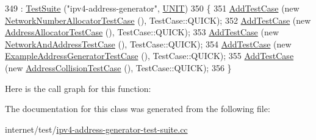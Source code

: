 \begin{DoxyCode}
349   : \hyperlink{classns3_1_1TestSuite_a904b0c40583b744d30908aeb94636d1a}{TestSuite} (\textcolor{stringliteral}{"ipv4-address-generator"}, \hyperlink{classns3_1_1TestSuite_a1ebfcab34ec8161e085e8e3a1855eae0a3885375a3787abf60431f8454b3cadbd}{UNIT})
350 \{
351   \hyperlink{classns3_1_1TestCase_a3718088e3eefd5d6454569d2e0ddd835}{AddTestCase} (\textcolor{keyword}{new} \hyperlink{classNetworkNumberAllocatorTestCase}{NetworkNumberAllocatorTestCase} (), 
      TestCase::QUICK);
352   \hyperlink{classns3_1_1TestCase_a3718088e3eefd5d6454569d2e0ddd835}{AddTestCase} (\textcolor{keyword}{new} \hyperlink{classAddressAllocatorTestCase}{AddressAllocatorTestCase} (), TestCase::QUICK);
353   \hyperlink{classns3_1_1TestCase_a3718088e3eefd5d6454569d2e0ddd835}{AddTestCase} (\textcolor{keyword}{new} \hyperlink{classNetworkAndAddressTestCase}{NetworkAndAddressTestCase} (), TestCase::QUICK);
354   \hyperlink{classns3_1_1TestCase_a3718088e3eefd5d6454569d2e0ddd835}{AddTestCase} (\textcolor{keyword}{new} \hyperlink{classExampleAddressGeneratorTestCase}{ExampleAddressGeneratorTestCase} (), 
      TestCase::QUICK);
355   \hyperlink{classns3_1_1TestCase_a3718088e3eefd5d6454569d2e0ddd835}{AddTestCase} (\textcolor{keyword}{new} \hyperlink{classAddressCollisionTestCase}{AddressCollisionTestCase} (), TestCase::QUICK);
356 \}
\end{DoxyCode}


Here is the call graph for this function\+:




The documentation for this class was generated from the following file\+:\begin{DoxyCompactItemize}
\item 
internet/test/\hyperlink{ipv4-address-generator-test-suite_8cc}{ipv4-\/address-\/generator-\/test-\/suite.\+cc}\end{DoxyCompactItemize}
